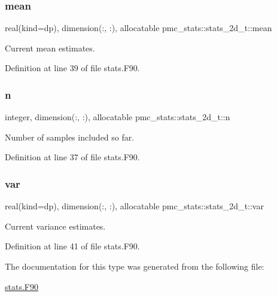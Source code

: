 \subsubsection{\texorpdfstring{mean}{mean}}
{\footnotesize\ttfamily real(kind=dp), dimension(\+:, \+:), allocatable pmc\+\_\+stats\+::stats\+\_\+2d\+\_\+t\+::mean}



Current mean estimates. 



Definition at line 39 of file stats.\+F90.

\mbox{\label{structpmc__stats_1_1stats__2d__t_a0e48a39cdca854ea5f86e33180952a20}} 
\subsubsection{\texorpdfstring{n}{n}}
{\footnotesize\ttfamily integer, dimension(\+:, \+:), allocatable pmc\+\_\+stats\+::stats\+\_\+2d\+\_\+t\+::n}



Number of samples included so far. 



Definition at line 37 of file stats.\+F90.

\mbox{\label{structpmc__stats_1_1stats__2d__t_ab0d5bdb6fa2e1833e9c29553c0e3327f}} 
\subsubsection{\texorpdfstring{var}{var}}
{\footnotesize\ttfamily real(kind=dp), dimension(\+:, \+:), allocatable pmc\+\_\+stats\+::stats\+\_\+2d\+\_\+t\+::var}



Current variance estimates. 



Definition at line 41 of file stats.\+F90.



The documentation for this type was generated from the following file\+:\begin{DoxyCompactItemize}
\item 
\mbox{\hyperlink{stats_8_f90}{stats.\+F90}}\end{DoxyCompactItemize}
